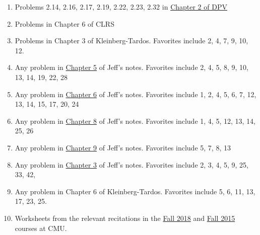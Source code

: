 \documentclass{article}
\begin{document}
\begin{enumerate}
    \item Problems 2.14, 2.16, 2.17, 2.19, 2.22, 2.23, 2.32 in \href{https://people.eecs.berkeley.edu/~vazirani/algorithms/chap2.pdf}{Chapter 2 of DPV}
    \item Problems in Chapter 6 of CLRS
    \item Problems in Chapter 3 of Kleinberg-Tardos. Favorites include 2, 4, 7, 9, 10, 12.
    \item Any problem in \href{http://jeffe.cs.illinois.edu/teaching/algorithms/book/05-graphs.pdf}{Chapter 5}  of Jeff's notes. Favorites include 2, 4, 5, 8, 9, 10, 13, 14, 19, 22, 28
    \item Any problem in \href{http://jeffe.cs.illinois.edu/teaching/algorithms/book/06-dfs.pdf}{Chapter 6} of Jeff's notes. Favorites include 1, 2, 4, 5, 6, 7, 12, 13, 14, 15, 17, 20, 24
    \item Any problem in \href{http://jeffe.cs.illinois.edu/teaching/algorithms/book/08-sssp.pdf}{Chapter 8} of Jeff's notes. Favorites include 1, 4, 5, 12, 13, 14, 25, 26
    \item Any problem in \href{http://jeffe.cs.illinois.edu/teaching/algorithms/book/09-apsp.pdf}{Chapter 9} of Jeff's notes. Favorites include 5, 7, 8, 13
    \item Any problem in \href{http://jeffe.cs.illinois.edu/teaching/algorithms/book/03-dynprog.pdf}{Chapter 3} of Jeff's notes. Favorites include 2, 3, 4, 5, 9, 25, 33, 42,
    \item Any problem in Chapter 6 of Kleinberg-Tardos. Favorites include 5, 6, 11, 13, 17, 23, 25.
    \item Worksheets from the relevant recitations in the \href{http://www.cs.cmu.edu/afs/cs/academic/class/15451-f18/www/index.html}{Fall 2018} and
    \href{http://www.cs.cmu.edu/~avrim/451/}{Fall 2015} courses at CMU.
\end{enumerate}
\end{document}
